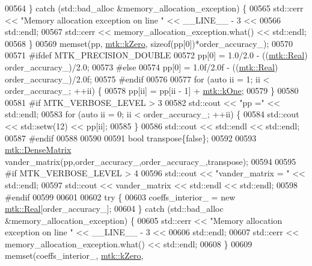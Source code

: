 \begin{DoxyCode}
{{00564   \} \textcolor{keywordflow}{catch} (std::bad\_alloc &memory\_allocation\_exception) \{
00565     std::cerr << \textcolor{stringliteral}{"Memory allocation exception on line "} << \_\_LINE\_\_ - 3 <<
00566       std::endl;
00567     std::cerr << memory\_allocation\_exception.what() << std::endl;
00568   \}
00569   memset(pp, \hyperlink{group__c01-roots_ga59a451a5fae30d59649bcda274fea271}{mtk::kZero}, \textcolor{keyword}{sizeof}(pp[0])*order\_accuracy\_);
00570 
00571 \textcolor{preprocessor}{  #ifdef MTK\_PRECISION\_DOUBLE}
00572   pp[0] = 1.0/2.0 - ((\hyperlink{group__c01-roots_gac080bbbf5cbb5502c9f00405f894857d}{mtk::Real}) order\_accuracy\_)/2.0;
00573 \textcolor{preprocessor}{  #else}
00574   pp[0] = 1.0f/2.0f - ((\hyperlink{group__c01-roots_gac080bbbf5cbb5502c9f00405f894857d}{mtk::Real}) order\_accuracy\_)/2.0f;
00575 \textcolor{preprocessor}{  #endif}
00576 
00577   \textcolor{keywordflow}{for} (\textcolor{keyword}{auto} ii = 1; ii < order\_accuracy\_; ++ii) \{
00578     pp[ii] = pp[ii - 1] + \hyperlink{group__c01-roots_ga26407c24d43b6b95480943340d285c71}{mtk::kOne};
00579   \}
00580 
00581 \textcolor{preprocessor}{  #if MTK\_VERBOSE\_LEVEL > 3}
00582   std::cout << \textcolor{stringliteral}{"pp ="} << std::endl;
00583   \textcolor{keywordflow}{for} (\textcolor{keyword}{auto} ii = 0; ii < order\_accuracy\_; ++ii) \{
00584     std::cout << std::setw(12) << pp[ii];
00585   \}
00586   std::cout << std::endl << std::endl;
00587 \textcolor{preprocessor}{  #endif}
00588 
00590 
00591   \textcolor{keywordtype}{bool} transpose\{\textcolor{keyword}{false}\};
00592 
00593   \hyperlink{classmtk_1_1DenseMatrix}{mtk::DenseMatrix} vander\_matrix(pp,order\_accuracy\_,order\_accuracy\_,transpose);
00594 
00595 \textcolor{preprocessor}{  #if MTK\_VERBOSE\_LEVEL > 4}
00596   std::cout << \textcolor{stringliteral}{"vander\_matrix = "} << std::endl;
00597   std::cout << vander\_matrix << std::endl << std::endl;
00598 \textcolor{preprocessor}{  #endif}
00599 
00601 
00602   \textcolor{keywordflow}{try} \{
00603     coeffs\_interior\_ = \textcolor{keyword}{new} \hyperlink{group__c01-roots_gac080bbbf5cbb5502c9f00405f894857d}{mtk::Real}[order\_accuracy\_];
00604   \} \textcolor{keywordflow}{catch} (std::bad\_alloc &memory\_allocation\_exception) \{
00605     std::cerr << \textcolor{stringliteral}{"Memory allocation exception on line "} << \_\_LINE\_\_ - 3 <<
00606       std::endl;
00607     std::cerr << memory\_allocation\_exception.what() << std::endl;
00608   \}
00609   memset(coeffs\_interior\_, \hyperlink{group__c01-roots_ga59a451a5fae30d59649bcda274fea271}{mtk::kZero},
}}
\end{DoxyCode}

